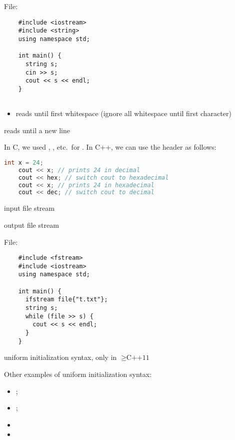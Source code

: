 File: 

\begin{lstlisting}
    #include <iostream>
    #include <string>
    using namespace std;
    
    int main() {
      string s;
      cin >> s;
      cout << s << endl;
    }    
    
\end{lstlisting}

\begin{itemize}
  \item reads until first whitespace (ignore all whitespace until first
        character)
\end{itemize}
 \textrightarrow{} reads until a new line

In C, we used , , etc.\ for . In C++, we
can use the  header as follows:
\begin{lstlisting}[language = C++]
    int x = 24;
    cout << x; // prints 24 in decimal
    cout << hex; // switch cout to hexadecimal
    cout << x; // prints 24 in hexadecimal
    cout << dec; // switch cout to decimal
\end{lstlisting}

 \textrightarrow{} input file stream

 \textrightarrow{} output file stream

File: 
\begin{lstlisting}
    #include <fstream>
    #include <iostream>
    using namespace std;
    
    int main() {
      ifstream file{"t.txt"};
      string s;
      while (file >> s) {
        cout << s << endl;
      }
    }    
\end{lstlisting}
\textrightarrow{} uniform initialization syntax, only in $ \geqslant\text{C++11} $

Other examples of uniform initialization syntax:
\begin{itemize}
  \item {};
  \item {};
\end{itemize}

\begin{itemize}
  \item {}
  \item {}
\end{itemize}

